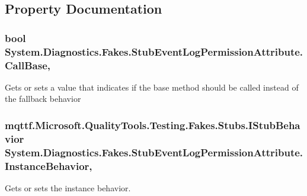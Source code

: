 \subsection{Property Documentation}
\hypertarget{class_system_1_1_diagnostics_1_1_fakes_1_1_stub_event_log_permission_attribute_a07fe841042b30ff2264e747be0842df2}{
\subsubsection[{Call\-Base}]{\setlength{\rightskip}{0pt plus 5cm}bool System.\-Diagnostics.\-Fakes.\-Stub\-Event\-Log\-Permission\-Attribute.\-Call\-Base\hspace{0.3cm}{\ttfamily [get]}, {\ttfamily [set]}}}\label{class_system_1_1_diagnostics_1_1_fakes_1_1_stub_event_log_permission_attribute_a07fe841042b30ff2264e747be0842df2}


Gets or sets a value that indicates if the base method should be called instead of the fallback behavior

\hypertarget{class_system_1_1_diagnostics_1_1_fakes_1_1_stub_event_log_permission_attribute_a5c34b0f94b733026ac861884c1bbbab8}{
\subsubsection[{Instance\-Behavior}]{\setlength{\rightskip}{0pt plus 5cm}mqttf.\-Microsoft.\-Quality\-Tools.\-Testing.\-Fakes.\-Stubs.\-I\-Stub\-Behavior System.\-Diagnostics.\-Fakes.\-Stub\-Event\-Log\-Permission\-Attribute.\-Instance\-Behavior\hspace{0.3cm}{\ttfamily [get]}, {\ttfamily [set]}}}\label{class_system_1_1_diagnostics_1_1_fakes_1_1_stub_event_log_permission_attribute_a5c34b0f94b733026ac861884c1bbbab8}


Gets or sets the instance behavior.

